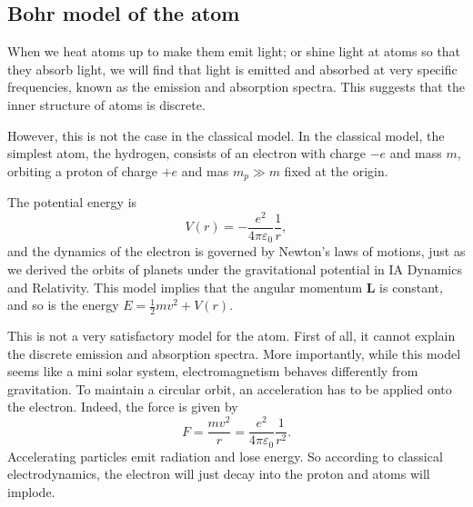 \documentclass[a4paper]{article}
\begin{document}
\subsection{Bohr model of the atom}
When we heat atoms up to make them emit light; or shine light at atoms so that they absorb light, we will find that light is emitted and absorbed at very specific frequencies, known as the emission and absorption spectra. This suggests that the inner structure of atoms is discrete.

However, this is not the case in the classical model. In the classical model, the simplest atom, the hydrogen, consists of an electron with charge $-e$ and mass $m$, orbiting a proton of charge $+e$ and mas $m_p \gg m$ fixed at the origin.

The potential energy is
\[
  V(r) = -\frac{e^2}{4\pi\varepsilon_0}\frac{1}{r},
\]
and the dynamics of the electron is governed by Newton's laws of motions, just as we derived the orbits of planets under the gravitational potential in IA Dynamics and Relativity. This model implies that the angular momentum $\mathbf{L}$ is constant, and so is the energy $E = \frac{1}{2}mv^2 + V(r)$.

This is not a very satisfactory model for the atom. First of all, it cannot explain the discrete emission and absorption spectra. More importantly, while this model seems like a mini solar system, electromagnetism behaves differently from gravitation. To maintain a circular orbit, an acceleration has to be applied onto the electron. Indeed, the force is given by
\[
  F = \frac{mv^2}{r} = \frac{e^2}{4\pi \varepsilon_0}\frac{1}{r^2}.
\]
Accelerating particles emit radiation and lose energy. So according to classical electrodynamics, the electron will just decay into the proton and atoms will implode.
\end{document}
